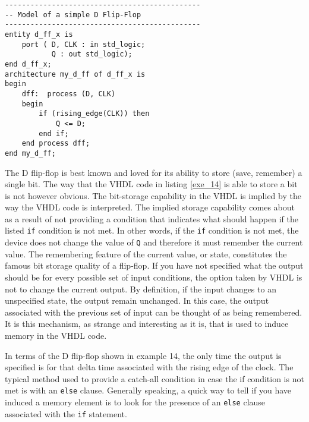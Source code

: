 \begin{lstlisting}[label=exe_14, caption=Solution to example 14.]
----------------------------------------------
-- Model of a simple D Flip-Flop
----------------------------------------------
entity d_ff_x is 
	port ( D, CLK : in std_logic; 
		   Q : out std_logic); 
end d_ff_x; 
architecture my_d_ff of d_ff_x is 
begin
	dff:  process (D, CLK)
	begin
		if (rising_edge(CLK)) then
			Q <= D; 
		end if; 
	end process dff; 
end my_d_ff; 
\end{lstlisting}

The D flip-flop is best known and loved for its ability to store (save, remember) a single bit. The way that the VHDL code in listing \ref{exe_14} is able to store a bit is not however obvious. The bit-storage capability in the VHDL is implied by the way the VHDL code is interpreted. The implied storage capability comes about as a result of not providing a condition that indicates what should happen if the listed \texttt{if} condition is not met. In other words, if the \texttt{if} condition is not met, the device does not change the value of \texttt{Q} and therefore it must remember the current value. The remembering feature of the current value, or state, constitutes the famous bit storage quality of a flip-flop. If you have not specified what the output should be for every possible set of input conditions, the option taken by VHDL is not to change the current output. By definition, if the input changes to an unspecified state, the output remain unchanged. In this case, the output associated with the previous set of input can be thought of as being remembered. It is this mechanism, as strange and interesting as it is, that is used to induce memory in the VHDL code. 

In terms of the D flip-flop shown in example 14, the only time the output is specified is for that delta time associated with the rising edge of the clock. The typical method used to provide a catch-all condition in case the if condition is not met is with an \texttt{else} clause. Generally speaking, a quick way to tell if you have induced a memory element is to look for the presence of an \texttt{else} clause associated with the \texttt{if} statement. 

